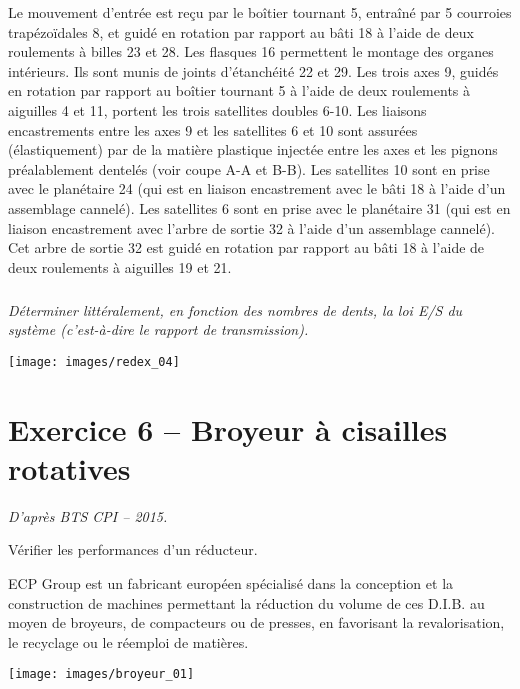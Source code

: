 \documentclass[10pt,fleqn]{article} %
\begin{document}
\begin{multicols}{2}
\begin{multicols}{2}
Le mouvement d’entrée est reçu par le boîtier tournant 5, entraîné par 5 courroies trapézoïdales 8, et guidé en rotation par rapport au bâti 18 à l’aide de deux roulements à billes 23 et 28. 
Les flasques 16 permettent le montage des organes intérieurs. Ils sont munis de joints d’étanchéité 22 et 29. 
Les trois axes 9, guidés en rotation par rapport au boîtier tournant 5 à l’aide de deux roulements à aiguilles 4 et 11, portent les trois satellites doubles 6-10.
Les liaisons encastrements entre les axes 9 et les satellites 6 et 10 sont assurées (élastiquement) par de la matière plastique injectée entre les axes et les pignons préalablement dentelés (voir coupe A-A et B-B). 
Les satellites 10 sont en prise avec le planétaire 24 (qui est en liaison encastrement avec le bâti 18 à l’aide d’un assemblage cannelé).
Les satellites 6 sont en prise avec le planétaire 31 (qui est en liaison encastrement avec l’arbre de sortie 32 à l’aide d’un assemblage cannelé). Cet arbre de sortie 32 est guidé en rotation par rapport au bâti 18 à l’aide de deux roulements à aiguilles 19 et 21.



\subparagraph{}
\textit{Déterminer littéralement, en fonction des nombres de dents, la loi E/S du système (c'est-à-dire le rapport de transmission).}


%
%
%

\begin{center}
\texttt{[image: images/redex\_04]}
\end{center}




\section*{Exercice 6 -- {Broyeur à cisailles rotatives}}
\setcounter{exo}{0}
\textit{D'après BTS CPI -- 2015.}

\begin{obj}
Vérifier les performances d'un réducteur.
\end{obj}
ECP Group est un fabricant européen spécialisé
dans la conception et la construction de machines
permettant la réduction du volume de ces D.I.B. au
moyen de broyeurs, de compacteurs ou de presses,
en favorisant la revalorisation, le recyclage ou le réemploi
de matières.

\begin{center}
\texttt{[image: images/broyeur\_01]}
\end{center}


\end{multicols}
\end{multicols}
\end{document}
